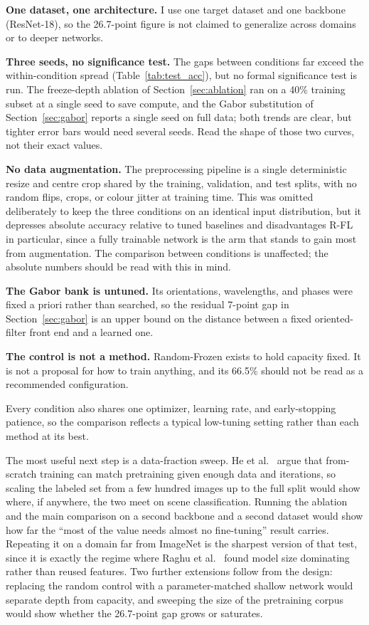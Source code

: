 \documentclass[conference]{IEEEtran}
\begin{document}
\textbf{One dataset, one architecture.} I use one target dataset and one backbone (ResNet-18), so the 26.7-point figure is not claimed to generalize across domains or to deeper networks.

\textbf{Three seeds, no significance test.} The gaps between conditions far exceed the within-condition spread (Table~\ref{tab:test_acc}), but no formal significance test is run. The freeze-depth ablation of Section~\ref{sec:ablation} ran on a 40\% training subset at a single seed to save compute, and the Gabor substitution of Section~\ref{sec:gabor} reports a single seed on full data; both trends are clear, but tighter error bars would need several seeds. Read the shape of those two curves, not their exact values.

\textbf{No data augmentation.} The preprocessing pipeline is a single deterministic resize and centre crop shared by the training, validation, and test splits, with no random flips, crops, or colour jitter at training time. This was omitted deliberately to keep the three conditions on an identical input distribution, but it depresses absolute accuracy relative to tuned baselines and disadvantages R-FL in particular, since a fully trainable network is the arm that stands to gain most from augmentation. The comparison between conditions is unaffected; the absolute numbers should be read with this in mind.

\textbf{The Gabor bank is untuned.} Its orientations, wavelengths, and phases were fixed a priori rather than searched, so the residual 7-point gap in Section~\ref{sec:gabor} is an upper bound on the distance between a fixed oriented-filter front end and a learned one.

\textbf{The control is not a method.} Random-Frozen exists to hold capacity fixed. It is not a proposal for how to train anything, and its 66.5\% should not be read as a recommended configuration.

Every condition also shares one optimizer, learning rate, and early-stopping patience, so the comparison reflects a typical low-tuning setting rather than each method at its best.

The most useful next step is a data-fraction sweep. He et al.~\cite{he2019rethinking} argue that from-scratch training can match pretraining given enough data and iterations, so scaling the labeled set from a few hundred images up to the full split would show where, if anywhere, the two meet on scene classification. Running the ablation and the main comparison on a second backbone and a second dataset would show how far the ``most of the value needs almost no fine-tuning'' result carries. Repeating it on a domain far from ImageNet is the sharpest version of that test, since it is exactly the regime where Raghu et al.~\cite{raghu2019transfusion} found model size dominating rather than reused features. Two further extensions follow from the design: replacing the random control with a parameter-matched shallow network would separate depth from capacity, and sweeping the size of the pretraining corpus would show whether the 26.7-point gap grows or saturates.
\end{document}
